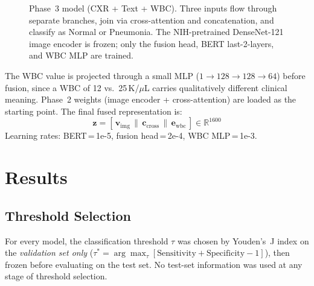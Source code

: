 \documentclass{article}
\begin{document}
\begin{figure}[t]
{%
}
\vspace{-2pt}
\caption{Phase~3 model (CXR + Text + WBC). Three inputs flow through
separate branches, join via cross-attention and concatenation, and
classify as Normal or Pneumonia. The NIH-pretrained DenseNet-121 image
encoder is frozen; only the fusion head, BERT last-2-layers, and WBC
MLP are trained.}
\label{fig:p3}
\end{figure}

The WBC value is projected through a small MLP
($1\!\to\!128\!\to\!128\!\to\!64$) before fusion, since a WBC of
12 vs.\ 25\,K/$\mu$L carries qualitatively different clinical meaning.
Phase~2 weights (image encoder + cross-attention) are loaded as
the starting point.
The final fused representation is:
\begin{equation}
  \mathbf{z} = [\,\mathbf{v}_{\mathrm{img}} \,\|\,
  \mathbf{c}_{\mathrm{cross}} \,\|\, \mathbf{e}_{\mathrm{wbc}}\,]
  \in \mathbb{R}^{1600}
  \label{eq:p3}
\end{equation}
Learning rates: BERT\,=\,1e-5, fusion head\,=\,2e-4,
WBC MLP\,=\,1e-3.

\section{Results}

\subsection{Threshold Selection}

For every model, the classification threshold $\tau$ was chosen by
Youden's~J index on the \emph{validation set only}
($\tau^* = \arg\max_\tau[\mathrm{Sensitivity}+\mathrm{Specificity}-1]$),
then frozen before evaluating on the test set.
No test-set information was used at any stage of threshold selection.
\end{document}
